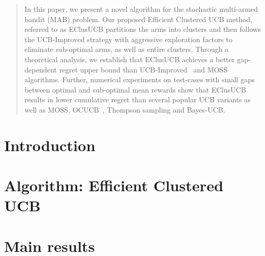 \documentclass{article}
\begin{document}

\begin{abstract}
In this paper, we present a novel algorithm for the stochastic multi-armed bandit (MAB) problem. Our proposed Efficient Clustered UCB method, referred to as EClusUCB partitions the arms into clusters and then follows the UCB-Improved strategy with aggressive exploration factors to eliminate sub-optimal arms, as well as entire clusters. Through a theoretical analysis, we establish that EClusUCB achieves a better gap-dependent regret upper bound than UCB-Improved~\cite{auer2010ucb} and MOSS~\cite{audibert2009minimax} algorithms. Further, numerical experiments on test-cases with small gaps between optimal and sub-optimal mean rewards show that EClusUCB results in lower cumulative regret than several popular UCB variants as well as MOSS, OCUCB~\cite{lattimore2015optimally}, Thompson sampling and Bayes-UCB\cite{kaufmann2012bayesian}. 

\end{abstract}
\section{Introduction}
\label{sec:intro}

%
%
%
\section{Algorithm: Efficient Clustered UCB}
\label{sec:eclusucb}

\section{Main results}
\label{sec:results}

\end{document}
